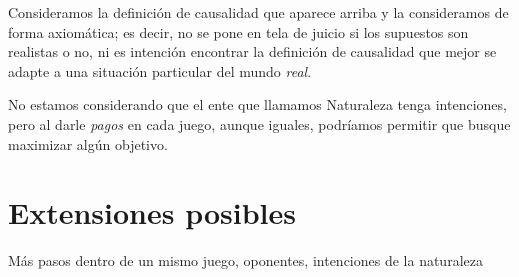 \documentclass[11pt]{article}
\theoremstyle{plain}
\begin{document}
Consideramos la definición de causalidad que aparece arriba y la consideramos de forma axiomática; es decir, no se pone en tela de juicio si los supuestos son realistas o no, ni es intención encontrar la definición de causalidad que mejor se adapte a una situación particular del mundo \textit{real}.

No estamos considerando que el ente que llamamos Naturaleza tenga intenciones, pero al darle \textit{pagos} en cada juego, aunque iguales, podríamos permitir que busque maximizar algún objetivo.

\section{Extensiones posibles}
Más pasos dentro de un mismo juego, oponentes, intenciones de la naturaleza



\end{document}
